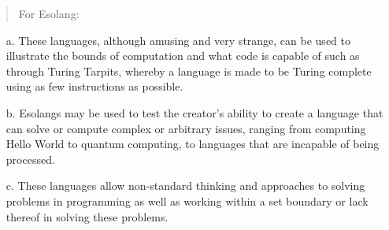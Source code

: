 \documentclass{article}
\begin{document}
\begin{quote}
For Esolang:
\end{quote}

\begin{enumerate}
  \item[a.] These languages, although amusing and very strange, can be used to illustrate the bounds of computation and what code is capable of such as through Turing Tarpits, whereby a language is made to be Turing complete using as few instructions as possible.\cite{turing-tarpit}
  \item[b.] Esolangs may be used to test the creator's ability to create a language that can solve or compute complex or arbitrary issues, ranging from computing Hello World to quantum computing, to languages that are incapable of being processed.\cite{hello-world-esolang}\cite{category-quantum-computing}
  \item[c.] These languages allow non-standard thinking and approaches to solving problems in programming as well as working within a set boundary or lack thereof in solving these problems.
\end{enumerate}
\end{document}

